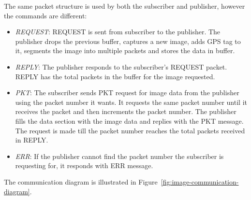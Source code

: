 The same packet structure is used by both the subscriber and publisher, however the commands are different:
\begin{itemize}
	\item \textit{REQUEST}: REQUEST is sent from subscriber to the publisher. The publisher drops the previous buffer, captures a new image, adds GPS tag to it, segments the image into multiple packets and stores the data in buffer.
	\item \textit{REPLY}: The publisher responds to the subscriber's REQUEST packet. REPLY has the total packets in the buffer for the image requested.
	\item \textit{PKT}: The subscriber sends PKT request for image data from the publisher using the packet number it wants. It requests the same packet number until it receives the packet and then increments the packet number. The publisher fills the data section with the image data and replies with the PKT message. The request is made till the packet number reaches the total packets received in REPLY.
	\item \textit{ERR}: If the publisher cannot find the packet number the subscriber is requesting for, it responds with ERR message.
\end{itemize}

The communication diagram is illustrated in Figure~\ref{fig:image-communication-diagram}.


